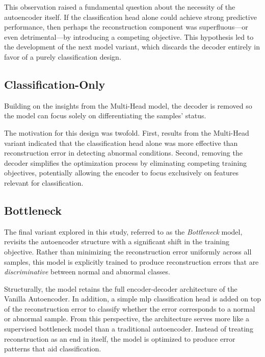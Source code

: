 This observation raised a fundamental question about the necessity of the autoencoder itself.
If the classification head alone could achieve strong predictive performance, then perhaps the reconstruction component was superfluous—or even detrimental—by introducing a competing objective.
This hypothesis led to the development of the next model variant, which discards the decoder entirely in favor of a purely classification design.


\subsection{Classification-Only}
\label{subsec:classify-model}
Building on the insights from the Multi-Head model, the decoder is removed so the model can focus solely on differentiating the samples' status.

The motivation for this design was twofold.
First, results from the Multi-Head variant indicated that the classification head alone was more effective than reconstruction error in detecting abnormal conditions.
Second, removing the decoder simplifies the optimization process by eliminating competing training objectives, potentially allowing the encoder to focus exclusively on features relevant for classification.


\subsection{Bottleneck}
\label{subsec:bottleneck-model}
The final variant explored in this study, referred to as the \emph{Bottleneck} model, revisits the autoencoder structure with a significant shift in the training objective.
Rather than minimizing the reconstruction error uniformly across all samples, this model is explicitly trained to produce reconstruction errors that are \emph{discriminative} between normal and abnormal classes.

Structurally, the model retains the full encoder-decoder architecture of the Vanilla Autoencoder.
In addition, a simple \gls{mlp} classification head is added on top of the reconstruction error to classify whether the error corresponds to a normal or abnormal sample.
From this perspective, the architecture serves more like a supervised bottleneck model than a traditional autoencoder.
Instead of treating reconstruction as an end in itself, the model is optimized to produce error patterns that aid classification.



